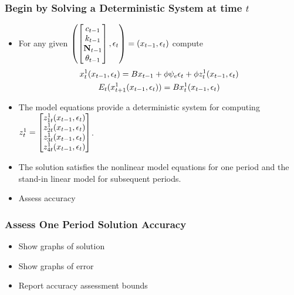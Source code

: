 \documentclass[letter]{beamer}
\begin{document}
\begin{frame}
  \frametitle{Begin by Solving a Deterministic System at time $t$}
{\small

  \begin{itemize}
  \item For any given $\left (  \begin{bmatrix}
c_{t-1}\\k_{t-1}\\ {\mathbf{N}}_{t-1}\\\theta_{t-1}
  \end{bmatrix}, \epsilon_t \right )=(x_{t-1},\epsilon_t)$ 
compute
  \begin{gather}
    \label{eq:3}
    x_t^1(x_{t-1},\epsilon_t)=B x_{t-1} + \phi \psi_e\epsilon_t + \phi z^1_t(x_{t-1},\epsilon_t)\\
    E_t(x^1_{t+1}(x_{t-1},\epsilon_t))=B x^1_{t}(x_{t-1},\epsilon_t)
  \end{gather}
\item The model equations provide a deterministic system  for computing $  z^1_t=\begin{bmatrix}
    z^1_{1t}(x_{t-1},\epsilon_t)\\
    z^1_{2t}(x_{t-1},\epsilon_t)\\
    z^1_{3t}(x_{t-1},\epsilon_t)\\
    z^1_{4t}(x_{t-1},\epsilon_t)
  \end{bmatrix}$.
\item The solution satisfies the nonlinear model equations for one 
period and the stand-in linear model for subsequent periods.
\item Assess accuracy
  \end{itemize}
}

\end{frame}

\begin{frame}
  \frametitle{Assess One Period Solution Accuracy}
  \begin{itemize}
  \item Show graphs of solution
  \item Show graphs of error
  \item Report accuracy assessment bounds
  \end{itemize}
\end{frame}
\end{document}
